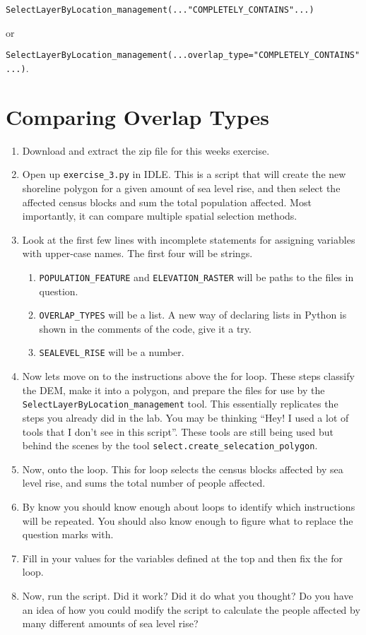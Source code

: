 \documentclass{article}
\begin{document}
\noindent
\texttt{SelectLayerByLocation\_management(..."COMPLETELY\_CONTAINS"...)} 

or 

\noindent
\texttt{SelectLayerByLocation\_management(...overlap\_type="COMPLETELY\_CONTAINS"...)}.

\section{Comparing Overlap Types}
\begin{enumerate}
    \item Download and extract the zip file for this weeks exercise.
    \item Open up \texttt{exercise\_3.py} in IDLE.  This is a script that will create the new shoreline polygon for a given amount of sea level rise, and then select the affected census blocks and sum the total population affected.  Most importantly, it can compare multiple spatial selection methods.
    \item Look at the first few lines with incomplete statements for assigning variables with upper-case names.  The first four will be strings. 
    \begin{enumerate}
        \item \texttt{POPULATION\_FEATURE} and \texttt{ELEVATION\_RASTER} will be paths to the files in question.  
        \item \texttt{OVERLAP\_TYPES} will be a list.  A new way of declaring lists in Python is shown in the comments of the code, give it a try.  
        \item \texttt{SEALEVEL\_RISE} will be a number.
    \end{enumerate}

    \item Now lets move on to the instructions above the for loop.  These steps classify the DEM, make it into a polygon, and prepare the files for use by the \texttt{SelectLayerByLocation\_management} tool.  This essentially replicates the steps you already did in the lab.  You may be thinking ``Hey!  I used a lot of tools that I don't see in this script''.  These tools are still being used but behind the scenes by the tool \texttt{select.create\_selecation\_polygon}.

    \item Now, onto the loop.  This for loop selects the census blocks affected by sea level rise, and sums the total number of people affected.  
    \item By know you should know enough about loops to identify which instructions will be repeated.  You should also know enough to figure what to replace the question marks with.  
    \item Fill in your values for the variables defined at the top and then fix the for loop.  
    \item Now, run the script.  Did it work?  Did it do what you thought?  Do you have an idea of how you could modify the script to calculate the people affected by many different amounts of sea level rise?
\end{enumerate}
\end{document}
